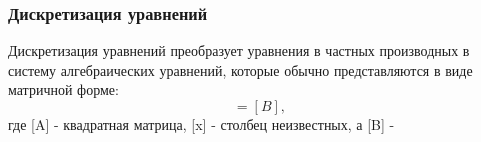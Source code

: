 		\subsubsection{Дискретизация уравнений}
			Дискретизация уравнений преобразует уравнения в частных производных в систему алгебраических уравнений, которые обычно представляются в виде матричной форме:
			\begin{equation}
				[A][x] = [B],
			\end{equation}
			где [A] - квадратная матрица, [x] - столбец неизвестных, а [B] - 
